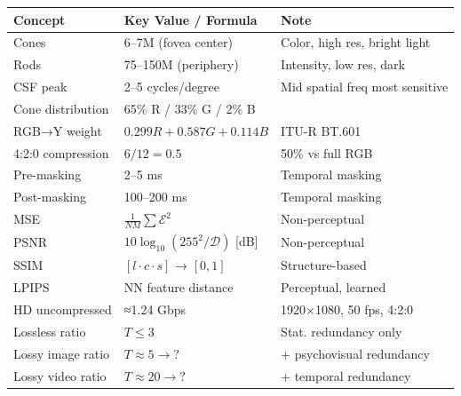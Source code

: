 \begin{center}
\begin{tabular}{|l|l|l|}
\hline
\textbf{Concept} & \textbf{Key Value / Formula} & \textbf{Note} \\ \hline
Cones & 6–7M (fovea center) & Color, high res, bright light \\ \hline
Rods & 75–150M (periphery) & Intensity, low res, dark \\ \hline
CSF peak & 2–5 cycles/degree & Mid spatial freq most sensitive \\ \hline
Cone distribution & 65\% R / 33\% G / 2\% B &  \\ \hline
RGB→Y weight & $0.299R+0.587G+0.114B$ & ITU-R BT.601 \\ \hline
4:2:0 compression & $6/12 = 0.5$ & 50\% vs full RGB \\ \hline
Pre-masking & 2–5 ms & Temporal masking \\ \hline
Post-masking & 100–200 ms & Temporal masking \\ \hline
MSE & $\frac{1}{NM}\sum\mathcal{E}^2$ & Non-perceptual \\ \hline
PSNR & $10\log_{10}(255^2/\mathcal{D})$ [dB] & Non-perceptual \\ \hline
SSIM & $[l\cdot c\cdot s]$ → $[0,1]$ & Structure-based \\ \hline
LPIPS & NN feature distance & Perceptual, learned \\ \hline
HD uncompressed & ≈1.24 Gbps & 1920×1080, 50 fps, 4:2:0 \\ \hline
Lossless ratio & $T\leq3$ & Stat. redundancy only \\ \hline
Lossy image ratio & $T\approx5\to ?$ & + psychovisual redundancy \\ \hline
Lossy video ratio & $T\approx20\to ?$ & + temporal redundancy \\ \hline
\end{tabular}
\end{center}

